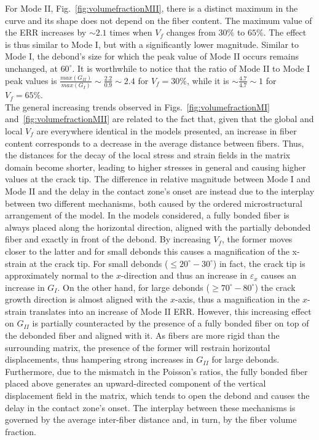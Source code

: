 \documentclass[review]{elsarticle}
\begin{document}
For Mode II, Fig.~\ref{fig:volumefractionMII}, there is a distinct maximum in the curve and its shape does not depend on the fiber content. The maximum value of the ERR increases by $\sim 2.1$ times when $V_{f}$ changes from $30\%$ to $65\%$. The effect is thus similar to Mode I, but with a significantly lower magnitude. Similar to Mode I, the debond's size for which the peak value of Mode II occurs remains unchanged, at $60^{\circ}$. It is worthwhile to notice that the ratio of Mode II to Mode I peak values is $\frac{max\left(G_{II}\right)}{max\left(G_{I}\right)}\sim\frac{2.2}{0.9}\sim 2.4$ for $V_{f}=30\%$, while it is $\sim\frac{4.7}{4.7}\sim 1$ for $V_{f}=65\%$.\\%
The general increasing trends observed in Figs.~\ref{fig:volumefractionMI} and~\ref{fig:volumefractionMII} are related to the fact that, given that the global and local $V_{f}$ are everywhere identical in the models presented, an increase in fiber content corresponds to a decrease in the average distance between fibers. Thus, the distances for the decay of the local stress and strain fields in the matrix domain become shorter, leading to higher stresses in general and causing higher values at the crack tip. The difference in relative magnitude between Mode I and Mode II and the delay in the contact zone's onset are instead due to the interplay between two different mechanisms, both caused by the ordered microstructural arrangement of the model. In the models considered, a fully bonded fiber is always placed along the horizontal direction, aligned with the partially debonded fiber and exactly in front of the debond. By increasing $V_{f}$, the former moves closer to the latter and for small debonds this causes a magnification of the x-strain at the crack tip. For small debonds ($\leq 20^{\circ}-30^{\circ}$) in fact, the crack tip is approximately normal to the $x$-direction and thus an increase in $\varepsilon_{x}$ causes an increase in $G_{I}$. On the other hand, for large debonds ($\geq 70^{\circ}-80^{\circ}$) the crack growth direction is almost aligned with the $x$-axis, thus a magnification in the $x$-strain translates into an increase of Mode II ERR. However, this increasing effect on $G_{II}$ is partially counteracted by the presence of a fully bonded fiber on top of the debonded fiber and aligned with it. As fibers are more rigid than the surrounding matrix, the presence of the former will restrain horizontal displacements, thus hampering strong increases in $G_{II}$ for large debonds. Furthermore, due to the mismatch in the Poisson's ratios, the fully bonded fiber placed above generates an upward-directed component of the vertical displacement field in the matrix, which tends to open the debond and causes the delay in the contact zone's onset. The interplay between these mechanisms is governed by the average inter-fiber distance and, in turn, by the fiber volume fraction.\\
\end{document}
